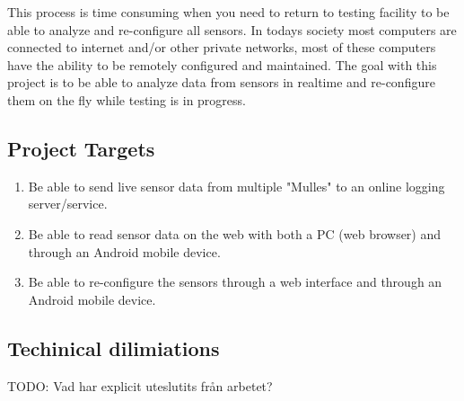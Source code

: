 This process is time consuming when you need to return to testing facility to be able to analyze and re-configure all sensors.
In todays society most computers are connected to internet and/or other private networks, most of these computers have the ability to be remotely configured and maintained.
The goal with this project is to be able to analyze data from sensors in realtime and re-configure them on the fly while testing is in progress.
\subsection{Project Targets}
\begin{enumerate}
\item Be able to send live sensor data from multiple "Mulles" to an online logging server/service.
\item Be able to read sensor data on the web with both a PC (web browser) and through an Android mobile device.
\item Be able to re-configure the sensors through a web interface and through an Android mobile device.
\end{enumerate}

\subsection{Techinical dilimiations}
TODO: Vad har explicit uteslutits från arbetet?

